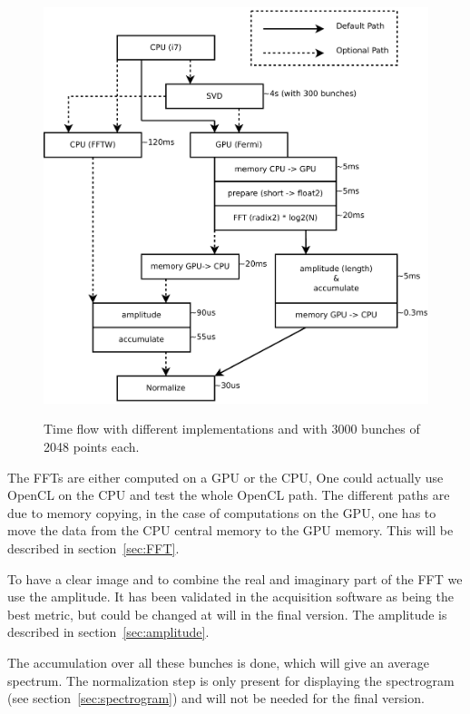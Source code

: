 \begin{figure}[H]
\caption{Time f\/low with different implementations and with 3000 bunches of 2048 points each.}
\centering
\includegraphics[scale=0.3]{PC-flow.pdf}
\label{fig:PCFlow}
\end{figure}

The \glspl{FFT} are either computed on a \gls{GPU} or the \gls{CPU}, One could actually use \gls{OpenCL} on the \gls{CPU} and test the whole \gls{OpenCL} path. The different paths are due to memory copying, in the case of computations on the \gls{GPU}, one has to move the data from the \gls{CPU} central memory to the \gls{GPU} memory. This will be described in section~\ref{sec:FFT}.

To have a clear image and to combine the real and imaginary part of the \gls{FFT} we use the amplitude. It has been validated in the acquisition software as being the best metric, but could be changed at will in the final version. The amplitude is described in section~\ref{sec:amplitude}.

The accumulation over all these bunches is done, which will give an average spectrum. The normalization step is only present for displaying the spectrogram (see section~\ref{sec:spectrogram}) and will not be needed for the final version.

